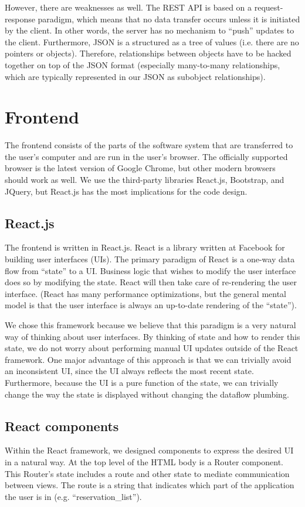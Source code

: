 \documentclass[12pt]{article}
\begin{document}
However, there are weaknesses as well. The REST API is based on a request-response paradigm, which means that no data transfer occurs unless it is initiated by the client. In other words, the server has no mechanism to ``push'' updates to the client. Furthermore, JSON is a structured as a tree of values (i.e. there are no pointers or objects). Therefore, relationships between objects have to be hacked together on top of the JSON format (especially many-to-many relationships, which are typically represented in our JSON as subobject relationships).

\section{Frontend}
\label{sec:Frontend}
The frontend consists of the parts of the software system that are transferred to the user's computer and are run in the user's browser. The officially supported browser is the latest version of Google Chrome, but other modern browsers should work as well. We use the third-party libraries React.js, Bootstrap, and JQuery, but React.js has the most implications for the code design.

\subsection{React.js}
The frontend is written in React.js. React is a library written at Facebook for building user interfaces (UIs). The primary paradigm of React is a one-way data flow from ``state'' to a UI. Business logic that wishes to modify the user interface does so by modifying the state. React will then take care of re-rendering the user interface. (React has many performance optimizations, but the general mental model is that the user interface is always an up-to-date rendering of the ``state'').

We chose this framework because we believe that this paradigm is a very natural way of thinking about user interfaces. By thinking of state and how to render this state, we do not worry about performing manual UI updates outside of the React framework. One major advantage of this approach is that we can trivially avoid an inconsistent UI, since the UI always reflects the most recent state. Furthermore, because the UI is a pure function of the state, we can trivially change the way the state is displayed without changing the dataflow plumbing.

\subsection{React components}
Within the React framework, we designed components to express the desired UI in a natural way. At the top level of the HTML body is a Router component. This Router's state includes a route and other state to mediate communication between views. The route is a string that indicates which part of the application the user is in (e.g. ``reservation\_list'').
\end{document}

